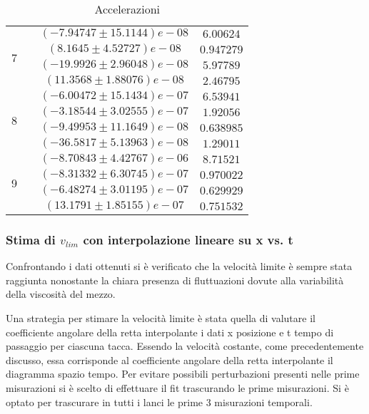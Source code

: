 \documentclass[a4paper,11pt,oneside]{article}
\begin{document}
\begin{table}[h!]
\begin{tabular}{|c|c|c|c|}
    \hline
    \multirow{4}{*}{7}& & $(-7.94747 \pm 15.1144)e-08$ & $6.00624$\\
    & & $(8.1645 \pm 4.52727)e-08$ & $0.947279$\\
    & & $(-19.9926 \pm 2.96048)e-08$ & $5.97789$\\
    & & $(11.3568 \pm 1.88076)e-08$ & $2.46795$\\
    \hline
    \multirow{4}{*}{8}& & $(-6.00472 \pm 15.1434)e-07$ & $6.53941$\\
    & & $(-3.18544 \pm 3.02555)e-07$ & $1.92056$\\
    & & $(-9.49953 \pm 11.1649)e-08$ & $0.638985$\\
    & & $(-36.5817 \pm 5.13963)e-08$ & $1.29011$\\
    \hline
    \multirow{4}{*}{9}& & $(-8.70843 \pm 4.42767)e-06$ & $8.71521$\\
    & & $(-8.31332 \pm 6.30745)e-07$ & $0.970022$\\
    & & $(-6.48274 \pm 3.01195)e-07$ & $0.629929$\\
    & & $(13.1791 \pm 1.85155)e-07$ & $0.751532$\\
    \hline
    \end{tabular}
    \caption{Accelerazioni}
    \label{tab:accelerazioni}
\end{table}


\subsubsection*{Stima di $v_{lim}$ con interpolazione lineare su x vs. t }
Confrontando i dati ottenuti si è verificato che la velocità limite è sempre stata raggiunta nonostante la chiara presenza di fluttuazioni dovute alla variabilità della viscosità del mezzo. 

Una strategia per stimare la velocità limite è stata quella di valutare il coefficiente angolare della retta interpolante i dati x posizione e t tempo di passaggio per ciascuna tacca.
Essendo la velocità costante, come precedentemente discusso, essa corrisponde al coefficiente angolare della retta interpolante il diagramma spazio tempo. Per evitare possibili perturbazioni presenti nelle prime misurazioni si è scelto di effettuare il fit trascurando le prime misurazioni. Si è optato per trascurare in tutti i lanci le prime 3 misurazioni temporali.
\end{document}
